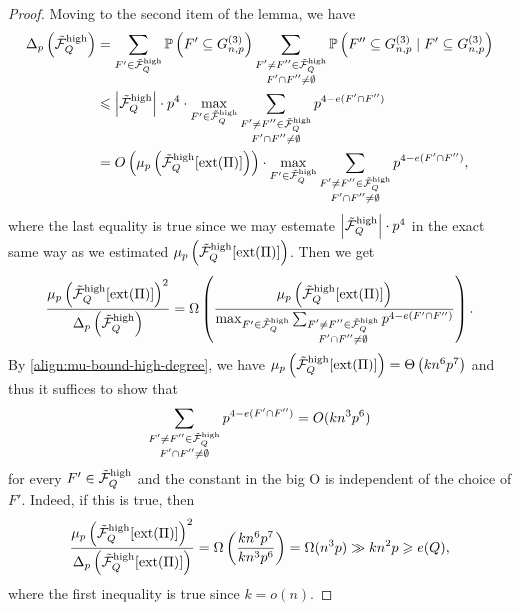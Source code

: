 \documentclass[11pt,a4paper,oneside,reqno]{amsart}
\newcommand{\Gnp}{G_{n, p}^{(3)}}
\newcommand{\cF}{\mathcal{F}}
\renewcommand{\Pr}{\mathbb{P}}
\newcommand{\1}{\mathbbm{1}} %
\renewcommand{\le}{\leqslant}
\renewcommand{\ge}{\geqslant}
\newcommand{\cTFQH}{\Tilde{\cF}_Q^{\mathrm{high}}}
\newcommand{\ext}{\mathrm{ext}}
\begin{document}
\begin{proof}
    Moving to the second item of the lemma, we have
    \begin{align*}
        \Delta_p\left(\cTFQH\right) &= \sum_{F' \in \cTFQH} \Pr\left(F' \subseteq \Gnp\right) \sum_{\substack{F' \neq F'' \in \cTFQH \\ F' \cap F'' \neq \emptyset}} \Pr\left(F'' \subseteq \Gnp \mid F' \subseteq \Gnp\right) \\
        &\le \left|\cTFQH\right| \cdot p^4 \cdot \max_{F' \in \cTFQH} \sum_{\substack{F' \neq F'' \in \cTFQH \\ F' \cap F'' \neq \emptyset}} p^{4-e(F' \cap F'')} \\
        &= O\left(\mu_p\left(\cTFQH[\ext(\Pi)]\right)\right) \cdot \max_{F' \in \cTFQH} \sum_{\substack{F' \neq F'' \in \cTFQH \\ F' \cap F'' \neq \emptyset}} p^{4-e(F' \cap F'')},
    \end{align*}
where the last equality is true since we may estemate $\left|\cTFQH\right| \cdot p^4$ in the exact same way as we estimated $\mu_p\left(\cTFQH[\ext(\Pi)]\right)$. Then we get
    \[
        \frac{\mu_p\left(\cTFQH[\ext(\Pi)]\right)^2}{\Delta_p\left(\cTFQH\right)} = \Omega\left( \frac{\mu_p\left(\cTFQH[\ext(\Pi)]\right)}{\max_{F' \in \cTFQH} \sum_{\substack{F' \neq F'' \in \cTFQH \\ F' \cap F'' \neq \emptyset}} p^{4-e(F' \cap F'')}} \right).
    \]
    By \eqref{align:mu-bound-high-degree}, we have $\mu_p\left(\cTFQH[\ext(\Pi)]\right) = \Theta\left(k n^6 p^7\right)$ and thus it suffices to show that 
    \begin{align}\label{align:high-degree-Delta}
        \sum_{\substack{F' \neq F'' \in \cTFQH \\ F' \cap F'' \neq \emptyset}} p^{4-e(F' \cap F'')} = O(kn^3 p^6)
    \end{align}
    for every $F' \in \cTFQH$ and the constant in the big O is independent of the choice of $F'$. Indeed, if this is true, then
    \[
        \frac{\mu_p\left(\cTFQH[\ext(\Pi)]\right)^2}{\Delta_p\left(\cTFQH[\ext(\Pi)]\right)} = \Omega\left(\frac{k n^6 p^7}{k n^3 p^6}\right) = \Omega(n^3 p) \gg k n^2 p \ge e(Q),
    \]
    where the first inequality is true since $k = o(n)$.


\end{proof}
\end{document}
